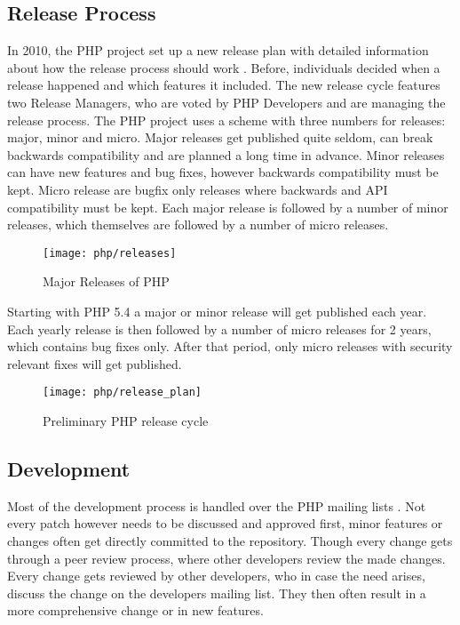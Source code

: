 
\subsection{Release Process} %
\label{sub:Release Process}

In 2010, the PHP project set up a new release plan with detailed information
about how the release process should work \cite{PHPRelease}. Before,
individuals decided when a release happened and which features it included. The
new release cycle features two Release Managers, who are voted by PHP
Developers and are managing the release process. The PHP project uses a scheme
with three numbers for releases: major, minor and micro. Major releases get
published quite seldom, can break backwards compatibility and are planned a
long time in advance. Minor releases can have new features and bug fixes,
however backwards compatibility must be kept. Micro release are bugfix only
releases where backwards and API compatibility must be kept. Each major release
is followed by a number of minor releases, which themselves are followed by a
number of micro releases.

\begin{figure}[htbp]
  \centering
  \texttt{[image: php/releases]}
  \caption{Major Releases of PHP}
\end{figure}

Starting with PHP 5.4 a major or minor release will get published each year. Each
yearly release is then followed by a number of micro releases for 2 years,
which contains bug fixes only. After that period, only micro releases with
security relevant fixes will get published.

\begin{figure}[htbp]
  \centering
  \texttt{[image: php/release\_plan]}
  \caption{Preliminary PHP release cycle}
\end{figure}


\subsection{Development} %
\label{sub:Development}

Most of the development process is handled over the PHP mailing lists
\cite{PHPRelease,Magnusson2010,PHPVoting}. Not every patch however needs to be
discussed and approved first, minor features or changes often get directly
committed to the repository. Though every change gets through a peer review
process, where other developers review the made changes. Every change gets
reviewed by other developers, who in case the need arises, discuss the change
on the developers mailing list. They then often result in a more comprehensive
change or in new features.

